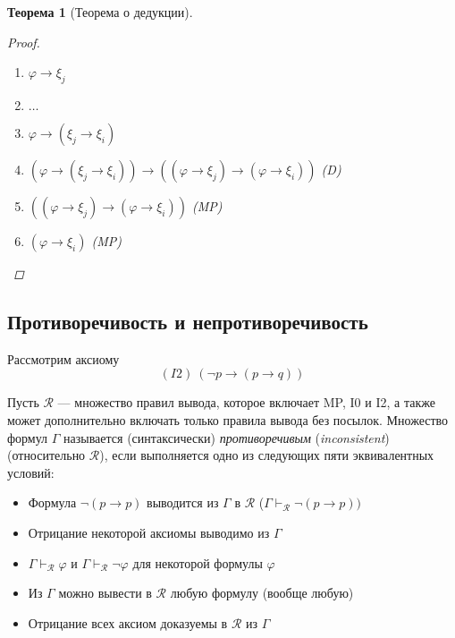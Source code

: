 \documentclass[12pt]{article}
\let\im\rightarrow
\let\n\neg
\theoremstyle{definition}
\theoremstyle{plain}
\newtheorem{theorem}{Теорема}[section]
\theoremstyle{remark}
\begin{document}
\begin{theorem}[Теорема о дедукции]
\begin{proof}
\begin{itemize}
\begin{enumerate}
          \item $\varphi \im \xi_j$

          \item $\dots$

          \item $\varphi \im (\xi_j \im \xi_i)$

          \item $(\varphi \im (\xi_j \im \xi_i)) \im ((\varphi \im
            \xi_j) \im (\varphi \im \xi_i))$ (D)

          \item $((\varphi \im \xi_j) \im (\varphi \im \xi_i))$ (MP)

          \item $(\varphi \im \xi_i)$ (MP)
        \end{enumerate}
    \end{itemize}
  \end{proof}
\end{theorem}

\subsection{Противоречивость и непротиворечивость}

Рассмотрим аксиому
\begin{displaymath}
  (I2)\ (\n p \im (p \im q))
\end{displaymath}

Пусть $\mathcal{R}$ --- множество правил вывода, которое включает MP,
I0 и I2, а также может дополнительно включать только правила вывода
без посылок. Множество формул $\Gamma$ называется (синтаксически)
\textit{противоречивым} (\textit{inconsistent}) (относительно
$\mathcal{R}$), если
выполняется одно из следующих пяти эквивалентных условий:
\begin{itemize}
  \item Формула $\n(p \im p)$ выводится из $\Gamma$ в $\mathcal{R}$
    ($\Gamma \vdash_{\mathcal{R}} \n (p \im p))$

  \item Отрицание некоторой аксиомы выводимо из $\Gamma$

  \item $\Gamma \vdash_{\mathcal{R}} \varphi$ и $\Gamma
    \vdash_{\mathcal{R}} \n \varphi$ для некоторой формулы $\varphi$

  \item Из $\Gamma$ можно вывести в $\mathcal{R}$ любую формулу (вообще любую)

  \item Отрицание всех аксиом доказуемы в $\mathcal{R}$ из $\Gamma$
\end{itemize}
\end{document}
